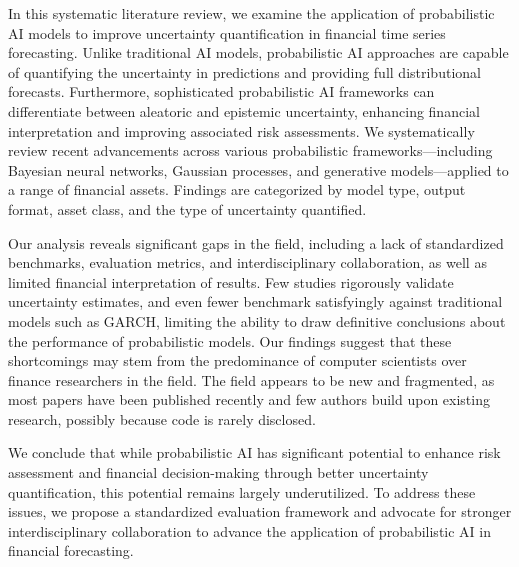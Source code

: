 \label{sec:abstract}


\normalsize

In this systematic literature review, we examine the application of probabilistic AI models to improve uncertainty quantification in financial time series forecasting. Unlike traditional AI models, probabilistic AI approaches are capable of quantifying the uncertainty in predictions and providing full distributional forecasts. Furthermore, sophisticated probabilistic AI frameworks can differentiate between aleatoric and epistemic uncertainty, enhancing financial interpretation and improving associated risk assessments. We systematically review recent advancements across various probabilistic frameworks—including Bayesian neural networks, Gaussian processes, and generative models—applied to a range of financial assets. Findings are categorized by model type, output format, asset class, and the type of uncertainty quantified.

Our analysis reveals significant gaps in the field, including a lack of standardized benchmarks, evaluation metrics, and interdisciplinary collaboration, as well as limited financial interpretation of results. Few studies rigorously validate uncertainty estimates, and even fewer benchmark satisfyingly against traditional models such as GARCH, limiting the ability to draw definitive conclusions about the performance of probabilistic models. Our findings suggest that these shortcomings may stem from the predominance of computer scientists over finance researchers in the field. The field appears to be new and fragmented, as most papers have been published recently and few authors build upon existing research, possibly because code is rarely disclosed.

We conclude that while probabilistic AI has significant potential to enhance risk assessment and financial decision-making through better uncertainty quantification, this potential remains largely underutilized. To address these issues, we propose a standardized evaluation framework and advocate for stronger interdisciplinary collaboration to advance the application of probabilistic AI in financial forecasting.



